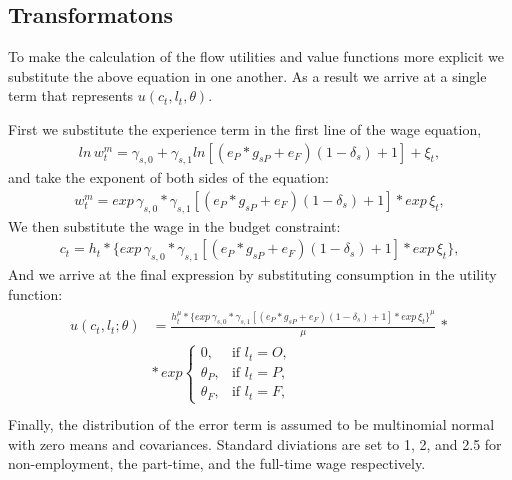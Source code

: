 \documentclass[letterpaper,10pt,english]{sphinxmanual}
\begin{document}
\subsection{Transformatons}
\label{\detokenize{computational_model:transformatons}}
To make the calculation of the flow utilities and value functions more explicit we substitute the above equation in one another. As a result we arrive at a single term that represents \(u(c_t, l_t, \theta)\).

First we substitute the experience term in the first line of the wage equation,
\begin{equation*}
\begin{split}ln \hspace{2pt} w_t^m = \gamma_{s,0}  + \gamma_{s,1} ln[(e_P*g_{sP} + e_F)(1-\delta_s) + 1] + \xi_t,\end{split}
\end{equation*}
and take the exponent of both sides of the equation:
\begin{equation*}
\begin{split}w_t^m = exp \hspace{2pt} {\gamma_{s,0}} * \gamma_{s,1}[(e_P*g_{sP} + e_F)(1-\delta_s) + 1] * exp \hspace{2pt} {\xi_t},\end{split}
\end{equation*}
We then substitute the wage in the budget constraint:
\begin{equation*}
\begin{split}c_t = h_t * \{exp \hspace{2pt} {\gamma_{s,0}} * \gamma_{s,1}[(e_P*g_{sP} + e_F)(1-\delta_s) + 1] * exp \hspace{2pt} {\xi_t}\},\end{split}
\end{equation*}
And we arrive at the final expression by substituting consumption in the utility function:
\begin{equation*}
\begin{split}\begin{split}
u(c_t, l_t; \theta) & = \frac{h_t^\mu * \{exp \hspace{2pt} {\gamma_{s,0}} * \gamma_{s,1}[(e_P*g_{sP} + e_F)(1-\delta_s) + 1] * exp \hspace{2pt} {\xi_t}\}^\mu}{\mu} \hspace{2pt} *\\
& * \hspace{2pt} exp
\begin{cases}
0, & \text{if $l_t = O$,}
\\[4pt]
\theta_P, & \text{if $l_t = P$},
\\[4pt]
\theta_F, & \text{if $l_t = F$},
\end{cases}\end{split}\\\end{split}
\end{equation*}
Finally, the distribution of the error term is assumed to be multinomial normal with zero means and covariances. Standard diviations are set to 1, 2, and 2.5 for non-employment, the part-time, and the full-time wage respectively.
\end{document}
